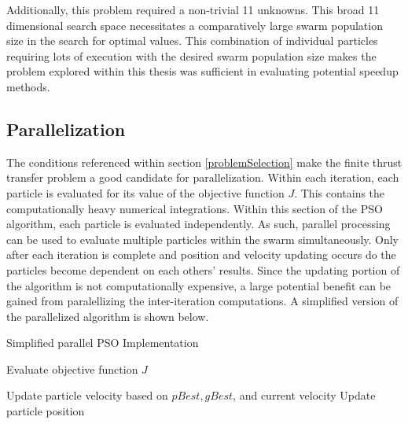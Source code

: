 Additionally, this problem required a non-trivial 11 unknowns. This broad 11 dimensional search space necessitates a comparatively large swarm population size
in the search for optimal values. This combination of individual particles requiring lots of execution with the desired swarm population size makes the problem explored within this thesis
was sufficient in evaluating potential speedup methods.

\subsection{Parallelization}

The conditions referenced within section \ref{problemSelection} make the finite thrust transfer problem a good candidate for parallelization.
Within each iteration, each particle is evaluated for its value of the objective function $J$. This  contains the computationally heavy numerical integrations. Within this section of the PSO algorithm, each particle is evaluated independently. 
As such, parallel processing can be used to evaluate multiple particles within the swarm simultaneously. Only after each iteration is complete and position and velocity updating occurs do the particles become dependent on each others' results. Since 
the updating portion of the algorithm is not computationally expensive, a large potential benefit can be gained from paralellizing the inter-iteration computations. A simplified version of the parallelized algorithm is shown below.

\begin{algorithm}[H]
    \caption{Simplified parallel PSO Implementation}
    \begin{algorithmic}
    \STATE Evaluate objective function $J$
    \hspace{17em}

    \ENDFOR
    \STATE Update particle velocity based on $pBest, gBest$, and current velocity
    \STATE Update particle position
    \ENDFOR
    \end{algorithmic}
\end{algorithm}

\newpage
